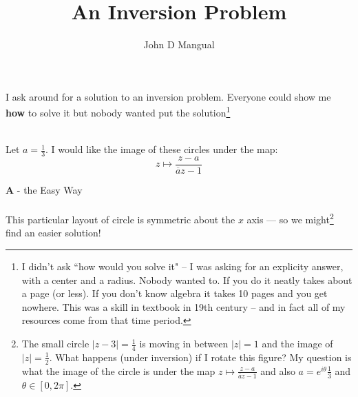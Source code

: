 \documentclass[12pt]{article}
\title{\textbf{ An Inversion Problem }}
\author{John D Mangual}
\date{}
\begin{document}
\selectfont \fontsize{24}{30}\selectfont

\maketitle

\noindent I ask around for a solution to an inversion problem.  Everyone could show me \textbf{how} to solve it but nobody wanted put the solution\footnote{I didn't ask ``how would you solve it" -- I was asking for an explicity answer, with a center and a radius.  Nobody wanted to.  If you do it neatly takes about a page (or less).  If you don't know algebra it takes 10 pages and you get nowhere.  This was a skill in textbook in 19th century -- and in fact all of my resources come from that time period.} \\ 
 \\ 
Let $a = \frac{1}{3}$.  I would like the image of these circles under the map:
$$ z \mapsto \frac{z - a}{\overline{a}z-1} $$


\newpage

\noindent \textbf{A} - the Easy Way \\ \\
This particular layout of circle is symmetric about the $x$ axis --- so we might\footnote{The small circle $|z-3|=\frac{1}{4}$ is moving in between $|z|=1$ and the image of $|z|=\frac{1}{2}$.  What happens (under inversion) if I rotate this figure? My question is what the image of the circle is under the map $z \mapsto  \frac{z - a}{\overline{a}z-1} $ and also $a = e^{i\theta} \frac{1}{3}$ and $\theta \in [0, 2\pi]$. } find an easier solution!
\end{document}
